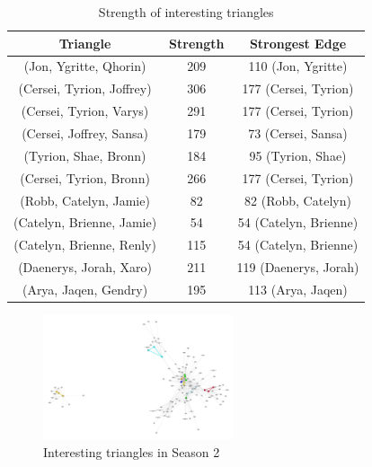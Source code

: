 \documentclass[10pt,twocolumn,letterpaper]{article}
\begin{document}
\begin{table}[!h]
    \centering
    \small
    \begin{tabular}{c|c|c}
        Triangle & Strength & Strongest Edge  \\
        \hline
        \small{(Jon, Ygritte, Qhorin)} & 209 & 110 \small{(Jon, Ygritte)} \\
        \small{(Cersei, Tyrion, Joffrey)} & 306 & 177 \small{(Cersei, Tyrion)} \\
        \small{(Cersei, Tyrion, Varys)} & 291 & 177 \small{(Cersei, Tyrion)} \\
        \small{(Cersei, Joffrey, Sansa)} & 179 & 73 \small{(Cersei, Sansa)} \\
        \small{(Tyrion, Shae, Bronn)} & 184 & 95 \small{(Tyrion, Shae)} \\
        \small{(Cersei, Tyrion, Bronn)} & 266 & 177 \small{(Cersei, Tyrion)} \\
        \small{(Robb, Catelyn, Jamie)} & 82 & 82 \small{(Robb, Catelyn)} \\
        \small{(Catelyn, Brienne, Jamie)} & 54 & 54 \small{(Catelyn, Brienne)} \\
        \small{(Catelyn, Brienne, Renly)} & 115 & 54 \small{(Catelyn, Brienne)} \\
        \small{(Daenerys, Jorah, Xaro)} & 211 & 119 \small{(Daenerys, Jorah)} \\
        \small{(Arya, Jaqen, Gendry)} & 195 & 113 \small{(Arya, Jaqen)} \\
        \hline
    \end{tabular}
    \vspace{0.2cm}
    \caption{Strength of interesting triangles}
    \label{tab:my_label}
\end{table}

\begin{figure}[!h]
    \centering
    \includegraphics[width=0.5\textwidth]{img/s2/triangles.jpg}
    \caption{\small{Interesting triangles in Season 2}}
\end{figure}
\end{document}
